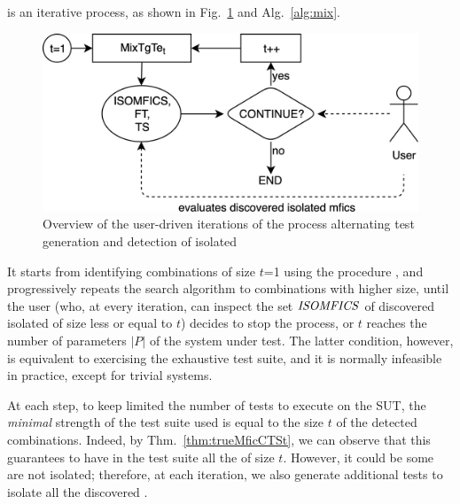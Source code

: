 \begin{tikzborder}{\cite{Gargantini16:validation}}
\begin{tikzborder}{\cite{gargantini_combinatorial_2017}}
\begin{tikzborder}{\cite{gargantini_combinatorial_2017}}
\begin{tikzborder}{\cite{garn2019}}
\begin{tikzborder}{\cite{arcaini2019achieving}}
\begin{tikzborder}{}
\mix is an iterative process, as shown in Fig.~\ref{fig:overallProcess} and Alg.~\ref{alg:mix}.
%
\begin{figure}[!htb]
	\centering
	\includegraphics[width=.9\columnwidth]{images/process_mix_fl_tg}
	\caption{Overview of the user-driven iterations of the process alternating test generation and detection of isolated \mfics}
	\label{fig:overallProcess}
\end{figure}
%
\begin{algorithm}[!htb]
	\begin{algorithmic}[1]
		\State{$\isoMficsSet \gets \emptyset$}\label{line:initMFICS}
		\State{$\ft \gets \emptyset$}\label{line:initFT2}
		\State{$\ts \gets \emptyset$}\label{line:initTS}
		\label{line:initT}
		\label{line:call}
		\label{line:increaseT}
		\EndWhile
	\end{algorithmic}
	\caption{\mix}
	\label{alg:mix}
\end{algorithm}
%
It starts from identifying combinations of size $t$=1 using the procedure \mixt, and progressively repeats the search algorithm to combinations with higher size, until the user (who, at every iteration, can inspect the set $\mathit{ISOMFICS}$ of discovered isolated \mfics of size less or equal to $t$) decides to stop the process, or $t$ reaches the number of parameters $\vert P \vert$ of the system under test. The latter condition, however, is equivalent to exercising the exhaustive test suite, and it is normally infeasible in practice, except for trivial systems.

At each step, to keep limited the number of tests to execute on the SUT, the {\it minimal} strength of the test suite used is equal to the size $t$ of the detected combinations. Indeed, by Thm.~\ref{thm:trueMficCTSt}, we can observe that this guarantees to have in the test suite all the \mfics of size $t$. However, it could be some \mfics are not isolated; therefore, at each iteration, we also generate additional tests to isolate all the discovered \mfics.


\end{tikzborder}
\end{tikzborder}
\end{tikzborder}
\end{tikzborder}
\end{tikzborder}
\end{tikzborder}
